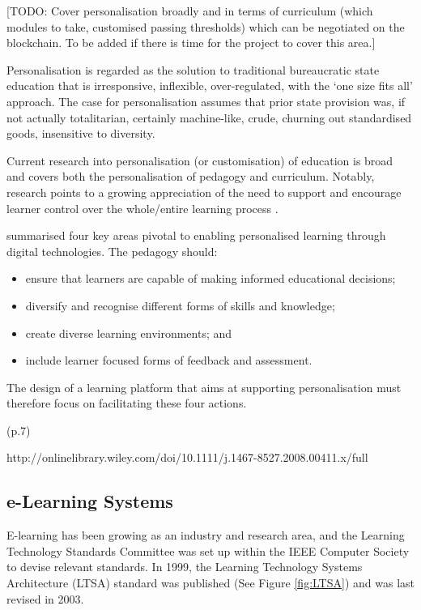 [TODO: Cover personalisation broadly and in terms of curriculum (which modules to take, 
customised passing thresholds) which can be negotiated on the blockchain.
To be added if there is time for the project to cover this area.]

Personalisation is regarded as the solution to traditional bureaucratic state education that is irresponsive, 
inflexible, over-regulated, with the ‘one size fits all’ approach. The case for personalisation assumes that prior state 
provision was, if not actually totalitarian, certainly machine-like, crude, churning out standardised goods, 
insensitive to diversity. \citep{bragg2014review}

Current research into personalisation (or customisation) of education is broad and covers both the personalisation 
of pedagogy and curriculum. Notably, research points to a growing appreciation of the need to support and 
encourage learner control over the whole/entire learning process \citep{dron2007designing}.

\citet{green2005futurelab} summarised four key areas pivotal to enabling personalised learning through digital 
technologies. The pedagogy should:

\begin{itemize}
    \setlength\itemsep{0em}    
    \item ensure that learners are capable of making informed educational decisions;
    \item diversify and recognise different forms of skills and knowledge;
    \item create diverse learning environments; and
    \item include learner focused forms of feedback and assessment.
\end{itemize}

The design of a learning platform that aims at supporting personalisation must therefore focus on facilitating these 
four actions.


(p.7)

http://onlinelibrary.wiley.com/doi/10.1111/j.1467-8527.2008.00411.x/full

\subsection{e-Learning Systems}

E-learning has been growing as an industry and research area, and the Learning Technology Standards Committee 
was set up within the IEEE Computer Society to devise relevant standards. In 1999, the Learning Technology 
Systems Architecture (LTSA) standard was published (See Figure \ref{fig:LTSA}) and was last revised in 2003.

